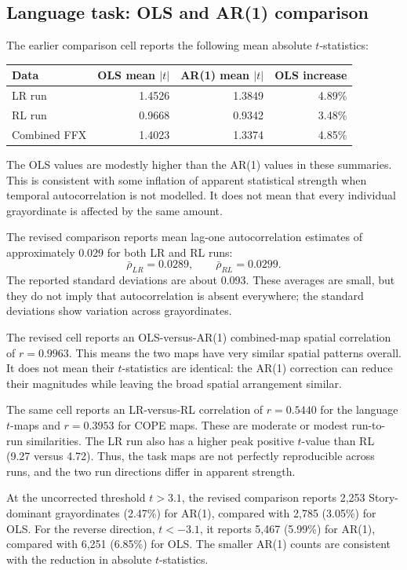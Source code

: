 \documentclass[11pt,a4paper]{article}
\begin{document}
\subsection{Language task: OLS and AR(1) comparison}

The earlier comparison cell reports the following mean absolute \(t\)-statistics:

\begin{center}
\begin{tabular}{lrrr}
\toprule
\textbf{Data} & \textbf{OLS mean \(|t|\)} & \textbf{AR(1) mean \(|t|\)} & \textbf{OLS increase}\\
\midrule
LR run & 1.4526 & 1.3849 & 4.89\%\\
RL run & 0.9668 & 0.9342 & 3.48\%\\
Combined FFX & 1.4023 & 1.3374 & 4.85\%\\
\bottomrule
\end{tabular}
\end{center}

The OLS values are modestly higher than the AR(1) values in these summaries. This is consistent with some inflation of apparent statistical strength when temporal autocorrelation is not modelled. It does not mean that every individual grayordinate is affected by the same amount.

The revised comparison reports mean lag-one autocorrelation estimates of approximately 0.029 for both LR and RL runs:
\[
    \bar{\rho}_{LR}=0.0289,\qquad
    \bar{\rho}_{RL}=0.0299.
\]
The reported standard deviations are about 0.093. These averages are small, but they do not imply that autocorrelation is absent everywhere; the standard deviations show variation across grayordinates.

The revised cell reports an OLS-versus-AR(1) combined-map spatial correlation of \(r=0.9963\). This means the two maps have very similar spatial patterns overall. It does not mean their \(t\)-statistics are identical: the AR(1) correction can reduce their magnitudes while leaving the broad spatial arrangement similar.

The same cell reports an LR-versus-RL correlation of \(r=0.5440\) for the language \(t\)-maps and \(r=0.3953\) for COPE maps. These are moderate or modest run-to-run similarities. The LR run also has a higher peak positive \(t\)-value than RL (9.27 versus 4.72). Thus, the task maps are not perfectly reproducible across runs, and the two run directions differ in apparent strength.

At the uncorrected threshold \(t>3.1\), the revised comparison reports 2,253 Story-dominant grayordinates (2.47\%) for AR(1), compared with 2,785 (3.05\%) for OLS. For the reverse direction, \(t<-3.1\), it reports 5,467 (5.99\%) for AR(1), compared with 6,251 (6.85\%) for OLS. The smaller AR(1) counts are consistent with the reduction in absolute \(t\)-statistics.
\end{document}
